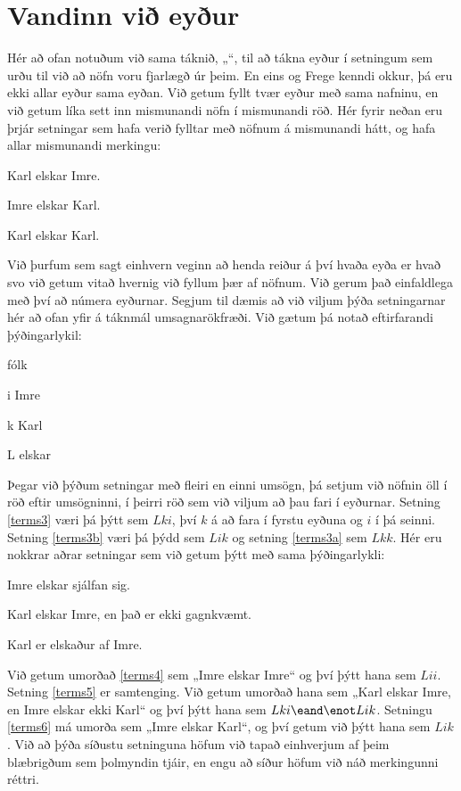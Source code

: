 \section{Vandinn við eyður}

Hér að ofan notuðum við sama táknið, „\blank“, til að tákna eyður í setningum sem urðu til við að nöfn voru fjarlægð úr þeim. En eins og Frege kenndi okkur, þá eru ekki allar eyður sama eyðan. Við getum fyllt tvær eyður með sama nafninu, en við getum líka sett inn mismunandi nöfn í mismunandi röð. Hér fyrir neðan eru þrjár setningar sem hafa verið fylltar með nöfnum á mismunandi hátt, og hafa allar mismunandi merkingu:
	\begin{earg}
	\item[\ex{terms3}] Karl elskar Imre.
	\item[\ex{terms3b}] Imre elskar Karl.
	\item[\ex{terms3a}] Karl elskar Karl.
\end{earg}
Við þurfum sem sagt einhvern veginn að henda reiður á því hvaða eyða er hvað svo við getum vitað hvernig við fyllum þær af nöfnum. Við gerum það einfaldlega með því að númera eyðurnar. Segjum til dæmis að við viljum þýða setningarnar hér að ofan yfir á táknmál umsagnarökfræði. Við gætum þá notað eftirfarandi þýðingarlykil:
	\begin{ekey}
		\item[\text{yfirgrip}] fólk
		\item[i] Imre
		\item[k] Karl
		\item[L]  elskar 
	\end{ekey}
Þegar við þýðum setningar með fleiri en einni umsögn, þá setjum við nöfnin öll í röð eftir umsögninni, í þeirri röð sem við viljum að þau fari í eyðurnar. Setning \ref{terms3} væri þá þýtt sem $Lki$, því $k$ á að fara í fyrstu eyðuna og $i$ í þá seinni. Setning \ref{terms3b} væri þá þýdd sem $Lik$ og setning \ref{terms3a} sem $Lkk$. Hér eru nokkrar aðrar setningar sem við getum þýtt með sama þýðingarlykli:

\begin{earg}
	\item[\ex{terms4}] Imre elskar sjálfan sig.
	\item[\ex{terms5}] Karl elskar Imre, en það er ekki gagnkvæmt.
	\item[\ex{terms6}] Karl er elskaður af Imre.
\end{earg}
Við getum umorðað \ref{terms4} sem „Imre elskar Imre“ og því þýtt hana sem $Lii$. Setning \ref{terms5} er samtenging. Við getum umorðað hana sem „Karl elskar Imre, en Imre elskar ekki Karl“ og því þýtt hana sem $Lki \eand \enot Lik$. Setningu \ref{terms6} má umorða sem „Imre elskar Karl“, og því getum við þýtt hana sem $Lik$. Við að þýða síðustu setninguna höfum við tapað einhverjum af þeim blæbrigðum sem þolmyndin tjáir, en engu að síður höfum við náð merkingunni réttri.

